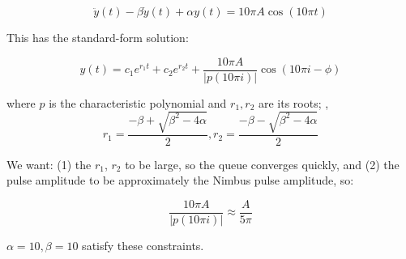 {\begin{Appendix}
\begin{equation}
    \ddot{y}(t) - \beta \dot{y}(t) + \alpha y(t) = 10\pi{}A \cos(10\pi{}t)
\end{equation}

    \noindent This has the standard-form solution:

\begin{equation}
    y(t) = c_1 e^{r_1 t} + c_2 e^{r_2 t} + \frac{10\pi{}A}{|p(10\pi{}i)|} \cos(10\pi{}i - \phi)
\end{equation}
        
where $p$ is the characteristic polynomial and $r_1, r_2$ are its roots;
\ie, 
\begin{equation}
r_1 = \frac{-\beta + \sqrt{\beta^2 - 4\alpha}}{2}, r_2 = \frac{-\beta - \sqrt{\beta^2 - 4\alpha}}{2}
\end{equation}

\noindent We want: (1) the $r_1$, $r_2$ to be large, so the queue converges quickly, and (2) the pulse amplitude to be approximately the Nimbus pulse amplitude, so:

\begin{equation}
\frac{10\pi{}A}{|p(10\pi{}i)|} \approx \frac{A}{5\pi}
\end{equation}

$\alpha = 10, \beta = 10$ satisfy these constraints.
\end{Appendix}
}

